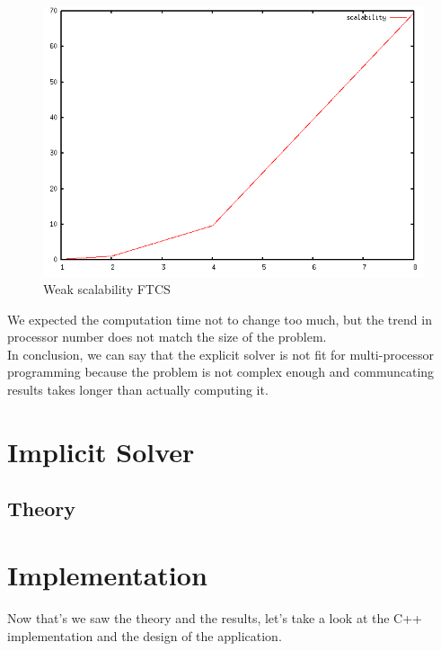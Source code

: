 \documentclass[12pt, a4paper]{report}
\begin{document}
\begin{figure}[H]
\includegraphics[scale=0.5]{report/weakFTCS}
\caption{Weak scalability FTCS}
\end{figure}
We expected the computation time not to change too much, but the trend in processor number does not match the size of the problem.
\\
In conclusion, we can say that the explicit solver is not fit for multi-processor programming because the problem is not complex enough and communcating results takes longer than actually computing it.

\chapter{Implicit Solver}
\section{Theory}

\chapter{Implementation}
Now that's we saw the theory and the results, let's take a look at the C++ implementation and the design of the application.
\end{document}
